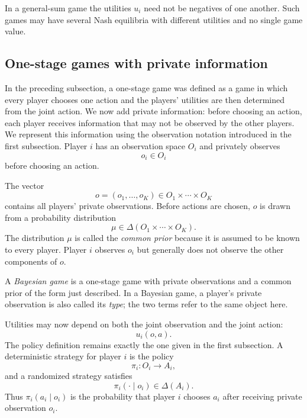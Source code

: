 In a general-sum game the utilities $u_i$ need not be negatives of one another. Such games may have several Nash equilibria with different utilities and no single game value.


\subsection{One-stage games with private information}

In the preceding subsection, a one-stage game was defined as a game in which every player chooses one action and the players' utilities are then determined from the joint action. We now add private information: before choosing an action, each player receives information that may not be observed by the other players. We represent this information using the observation notation introduced in the first subsection. Player $i$ has an observation space $O_i$ and privately observes
\[
    o_i\in O_i
\]
before choosing an action.

The vector
\[
    o=(o_1,\ldots,o_K)
    \in O_1\times\cdots\times O_K
\]
contains all players' private observations. Before actions are chosen, $o$ is drawn from a probability distribution
\[
    \mu\in\Delta(O_1\times\cdots\times O_K).
\]
The distribution $\mu$ is called the \emph{common prior} because it is assumed to be known to every player. Player $i$ observes $o_i$ but generally does not observe the other components of $o$.

A \emph{Bayesian game} is a one-stage game with private observations and a common prior of the form just described. In a Bayesian game, a player's private observation is also called its \emph{type}; the two terms refer to the same object here.

Utilities may now depend on both the joint observation and the joint action:
\[
    u_i(o,a).
\]
The policy definition remains exactly the one given in the first subsection. A deterministic strategy for player $i$ is the policy
\[
    \pi_i:O_i\to A_i,
\]
and a randomized strategy satisfies
\[
    \pi_i(\cdot\mid o_i)\in\Delta(A_i).
\]
Thus $\pi_i(a_i\mid o_i)$ is the probability that player $i$ chooses $a_i$ after receiving private observation $o_i$.

